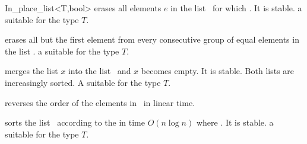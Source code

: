 \begin{ccClassTemplate}{In_place_list<T,bool>}
    {erases all elements $e$ in the list \ccVar\ for which . It is stable. 
    \ccPrecond a suitable  for the type $T$.}

    {erases all but the first element from every consecutive group of
      equal elements in the list \ccVar.
    \ccPrecond a suitable  for the type $T$.}

    {merges the list $x$ into the list \ccVar\ and $x$ becomes
      empty. It is stable.
    \ccPrecond Both lists are increasingly sorted. A suitable
     for the type $T$.}

    {reverses the order of the elements in \ccVar\ in linear time.}

    {sorts the list \ccVar\ according to the  in
      time $O(n \log n)$ where . It is stable.
    \ccPrecond a suitable  for the type $T$.}

\newpage
\ccExample






% 
% 

\end{ccClassTemplate}


\newpage
